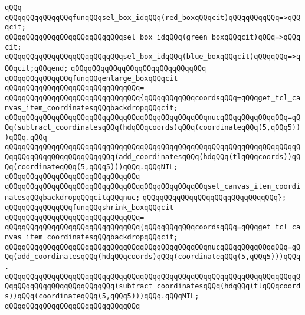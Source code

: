\verb|qQQq|\newline
\verb|qQQqqQQqqQQqqQQqfunqQQqsel_box_idqQQq(red_boxqQQqcit)qQQqqQQqqQQq=>qQQqcit;|\newline
\verb|qQQqqQQqqQQqqQQqqQQqqQQqqQQqsel_box_idqQQq(green_boxqQQqcit)qQQq=>qQQqcit;|\newline
\verb|qQQqqQQqqQQqqQQqqQQqqQQqqQQqsel_box_idqQQq(blue_boxqQQqcit)qQQqqQQq=>qQQqcit;qQQqend;|\newline
\verb|qQQqqQQqqQQqqQQqqQQqqQQqqQQqqQQq|\newline
\verb|qQQqqQQqqQQqqQQqfunqQQqenlarge_boxqQQqcit|\newline
\verb|qQQqqQQqqQQqqQQqqQQqqQQqqQQqqQQq=|\newline
\verb|qQQqqQQqqQQqqQQqqQQqqQQqqQQqqQQq{qQQqqQQqqQQqcoordsqQQq=qQQqget_tcl_canvas_item_coordinatesqQQqbackdropqQQqcit;|\newline
\verb|qQQqqQQqqQQqqQQqqQQqqQQqqQQqqQQqqQQqqQQqqQQqqQQqnucqQQqqQQqqQQqqQQq=qQQq(subtract_coordinatesqQQq(hdqQQqcoords)qQQq(coordinateqQQq(5,qQQq5)))qQQq.qQQq|\newline
\verb|qQQqqQQqqQQqqQQqqQQqqQQqqQQqqQQqqQQqqQQqqQQqqQQqqQQqqQQqqQQqqQQqqQQqqQQqqQQqqQQqqQQqqQQqqQQqqQQq(add_coordinatesqQQq(hdqQQq(tlqQQqcoords))qQQq(coordinateqQQq(5,qQQq5)))qQQq.qQQqNIL;|\newline
\verb|qQQqqQQqqQQqqQQqqQQqqQQqqQQqqQQq|\newline
\verb|qQQqqQQqqQQqqQQqqQQqqQQqqQQqqQQqqQQqqQQqqQQqqQQqset_canvas_item_coordinatesqQQqbackdropqQQqcitqQQqnuc;|\newline
\verb|qQQqqQQqqQQqqQQqqQQqqQQqqQQqqQQq};|\newline
\newline
\verb|qQQqqQQqqQQqqQQqfunqQQqshrink_boxqQQqcit|\newline
\verb|qQQqqQQqqQQqqQQqqQQqqQQqqQQqqQQq=|\newline
\verb|qQQqqQQqqQQqqQQqqQQqqQQqqQQqqQQq{qQQqqQQqqQQqcoordsqQQq=qQQqget_tcl_canvas_item_coordinatesqQQqbackdropqQQqcit;|\newline
\verb|qQQqqQQqqQQqqQQqqQQqqQQqqQQqqQQqqQQqqQQqqQQqqQQqnucqQQqqQQqqQQqqQQq=qQQq(add_coordinatesqQQq(hdqQQqcoords)qQQq(coordinateqQQq(5,qQQq5)))qQQq.|\newline
\verb|qQQqqQQqqQQqqQQqqQQqqQQqqQQqqQQqqQQqqQQqqQQqqQQqqQQqqQQqqQQqqQQqqQQqqQQqqQQqqQQqqQQqqQQqqQQqqQQq(subtract_coordinatesqQQq(hdqQQq(tlqQQqcoords))qQQq(coordinateqQQq(5,qQQq5)))qQQq.qQQqNIL;|\newline
\verb|qQQqqQQqqQQqqQQqqQQqqQQqqQQqqQQq|\newline
